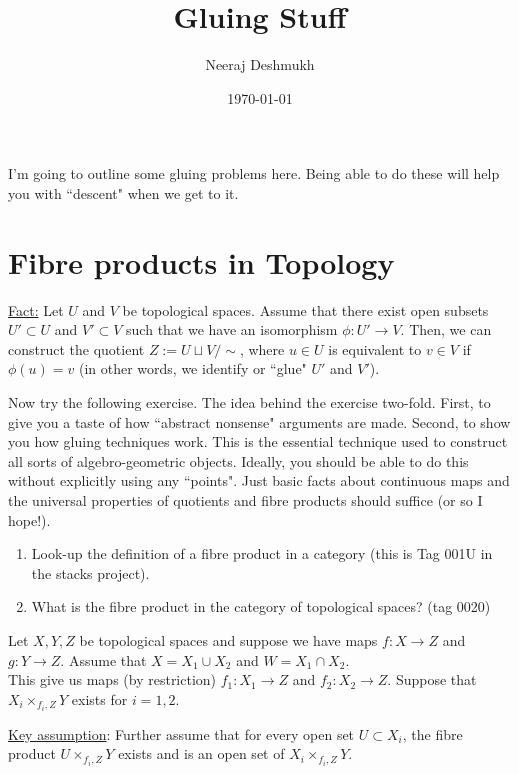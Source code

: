 \documentclass[10pt]{amsart}
\theoremstyle{definition}
\begin{document}
\title{Gluing Stuff}

\author{Neeraj Deshmukh}
\date{\today}

\maketitle
I'm going to outline some gluing problems here. Being able to do these will help you with ``descent" when we get to it.

\section{Fibre products in Topology}


\noindent\underline{Fact:} Let $U$ and $V$ be topological spaces. Assume that there exist open subsets $U'\subset U$ and $V'\subset V$ such that we have an isomorphism $\phi: U'\rightarrow V$. Then, we can construct the quotient $Z:= U\sqcup V/\sim$, where $u\in U$ is equivalent to $v\in V$ if $\phi(u)=v$ (in other words, we identify or ``glue" $U'$ and $V'$).

Now try the following exercise. The idea behind the exercise two-fold. First, to give you a taste of how ``abstract nonsense" arguments are made. Second, to show you how gluing techniques work. This is the essential technique used to construct all sorts of algebro-geometric objects. Ideally, you should be able to do this without explicitly using any ``points". Just basic facts about continuous maps and the universal properties of quotients and fibre products should suffice (or so I hope!).

\begin{enumerate}\addtocounter{enumi}{-1}
	\item Look-up the definition of a fibre product in a category (this is Tag 001U in the stacks project).
	\item What is the fibre product in the category of topological spaces? (tag 0020)
\end{enumerate}

Let $X, Y, Z$  be topological spaces and suppose we have maps $f:X\rightarrow Z$ and $g:Y\rightarrow Z$.
Assume that $X=X_1 \cup X_2$ and $W=X_1\cap X_2$.\\
This give us maps (by restriction) $f_1: X_1\rightarrow Z$ and $f_2:X_2\rightarrow Z$. Suppose that $X_i\times_{f_i,Z} Y$ exists for $i=1,2$.

\noindent\underline{Key assumption}: Further assume that for every open set $U\subset X_i$, the fibre product $U\times_{f_i,Z}Y$ exists and is an open set of $X_i\times_{f_i,Z}Y$.
\end{document}
